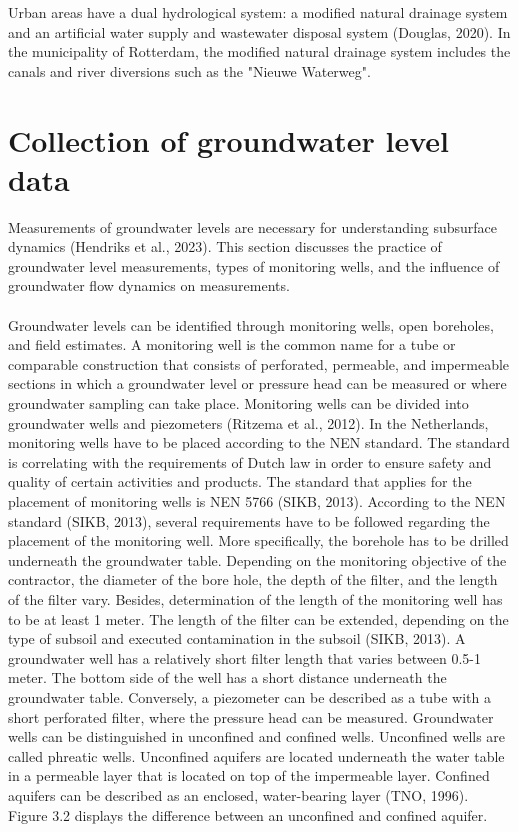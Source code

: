 Urban areas have a dual hydrological system: a modified natural drainage system and an artificial water supply and wastewater disposal system (Douglas, 2020). In the municipality of Rotterdam, the modified natural drainage system includes the canals and river diversions such as the "Nieuwe Waterweg". 


\section{Collection of groundwater level data}
Measurements of groundwater levels are necessary for understanding subsurface dynamics (Hendriks et al., 2023). This section discusses the practice of groundwater level measurements, types of monitoring wells, and the influence of groundwater flow dynamics on measurements. \\
\\
Groundwater levels can be identified through monitoring wells, open boreholes, and field estimates. A monitoring well is the common name for a tube or comparable construction that consists of perforated, permeable, and impermeable sections in which a groundwater level or pressure head can be measured or where groundwater sampling can take place. Monitoring wells can be divided into groundwater wells and piezometers (Ritzema et al., 2012). In the Netherlands, monitoring wells have to be placed according to the NEN standard. The standard is correlating with the requirements of Dutch law in order to ensure safety and quality of certain activities and products. The standard that applies for the placement of monitoring wells is NEN 5766 (SIKB, 2013). According to the NEN standard (SIKB, 2013), several requirements have to be followed regarding the placement of the monitoring well. More specifically, the borehole has to be drilled underneath the groundwater table. Depending on the monitoring objective of the contractor, the diameter of the bore hole, the depth of the filter, and the length of the filter vary. Besides, determination of the length of the monitoring well has to be at least 1 meter. The length of the filter can be extended, depending on the type of subsoil and executed contamination in the subsoil (SIKB, 2013). A groundwater well has a relatively short filter length that varies between 0.5-1 meter. The bottom side of the well has a short distance underneath the groundwater table. 
Conversely, a piezometer can be described as a tube with a short perforated filter, where the pressure head can be measured. Groundwater wells can be distinguished in unconfined and confined wells. Unconfined wells are called phreatic wells. Unconfined aquifers are located underneath the water table in a permeable layer that is located on top of the impermeable layer. Confined aquifers can be described as an enclosed, water-bearing layer (TNO, 1996). Figure 3.2 displays the difference between an unconfined and confined aquifer. 

